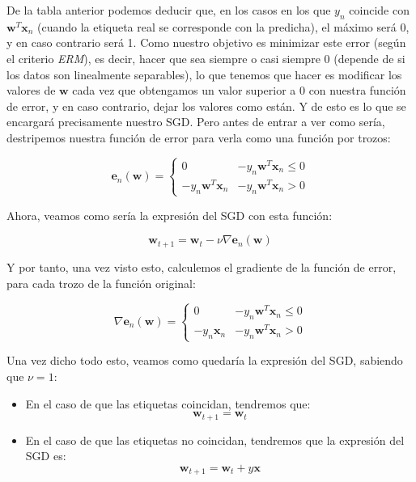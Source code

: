 \documentclass[11pt,a4paper]{article}
\begin{document}
De la tabla anterior podemos deducir que, en los casos en los que $y_n$ coincide con $\mathbf{w}^T\mathbf{x}_n$ (cuando la
etiqueta real se corresponde con la predicha), el máximo será 0, y en caso contrario será 1. Como nuestro objetivo es
minimizar este error (según el criterio \textit{ERM}), es decir, hacer que sea siempre o casi siempre 0 (depende de si los
datos son linealmente separables), lo que tenemos que hacer es modificar los valores de $\mathbf{w}$ cada vez que obtengamos
un valor superior a 0 con nuestra función de error, y en caso contrario, dejar los valores como están. Y de esto es lo que se
encargará precisamente nuestro SGD. Pero antes de entrar a ver como sería, destripemos nuestra función de error para verla
como una función por trozos:

\begin{equation}
\mathbf{e}_n(\mathbf{w}) = 
\begin{cases}
	0 & -y_n\mathbf{w}^T\mathbf{x}_n \leq 0 \\
	-y_n\mathbf{w}^T\mathbf{x}_n & -y_n\mathbf{w}^T\mathbf{x}_n > 0
\end{cases}
\end{equation}

Ahora, veamos como sería la expresión del SGD con esta función:

\begin{equation}
	\mathbf{w}_{t+1} = \mathbf{w}_{t} - \nu \nabla \mathbf{e}_n(\mathbf{w})
\end{equation}

Y por tanto, una vez visto esto, calculemos el gradiente de la función de error, para cada trozo de la función original:

\begin{equation}
\nabla \mathbf{e}_n(\mathbf{w}) = 
\begin{cases}
	0 & -y_n\mathbf{w}^T\mathbf{x}_n \leq 0 \\
	-y_n\mathbf{x}_n & -y_n\mathbf{w}^T\mathbf{x}_n > 0
\end{cases}
\end{equation}

Una vez dicho todo esto, veamos como quedaría la expresión del SGD, sabiendo que $\nu = 1$:

\begin{itemize}
	\item En el caso de que las etiquetas coincidan, tendremos que:
	\begin{equation}
		\mathbf{w}_{t+1} = \mathbf{w}_{t}
	\end{equation}
	\item En el caso de que las etiquetas no coincidan, tendremos que la expresión del SGD es:
	\begin{equation}
		\mathbf{w}_{t+1} = \mathbf{w}_{t} + y\mathbf{x}
	\end{equation}
\end{itemize}
\end{document}
